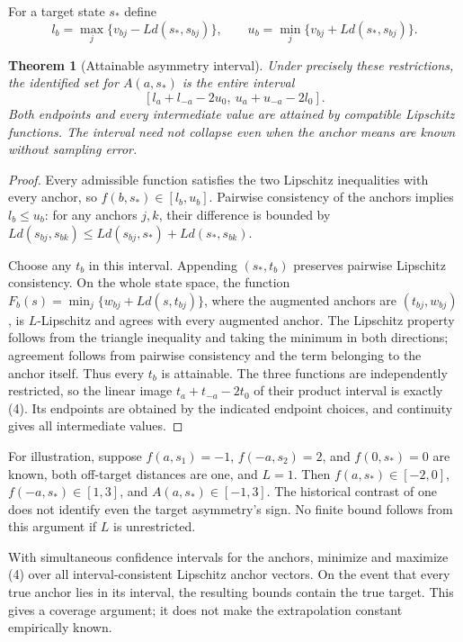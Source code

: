 \documentclass[11pt]{article}
\newtheorem{theorem}{Theorem}
\theoremstyle{definition}
\begin{document}
For a target state $s_*$ define
\[
 l_b=\max_j\{v_{bj}-L d(s_*,s_{bj})\},\qquad
 u_b=\min_j\{v_{bj}+L d(s_*,s_{bj})\}.
\]
\begin{theorem}[Attainable asymmetry interval]
Under precisely these restrictions, the identified set for $A(a,s_*)$ is the entire interval
\[
 [l_a+l_{-a}-2u_0,\ u_a+u_{-a}-2l_0].
 \tag{4}
\]
Both endpoints and every intermediate value are attained by compatible Lipschitz functions. The interval need not collapse even when the anchor means are known without sampling error.
\end{theorem}
\begin{proof}
Every admissible function satisfies the two Lipschitz inequalities with every anchor, so $f(b,s_*)\in[l_b,u_b]$. Pairwise consistency of the anchors implies $l_b\le u_b$: for any anchors $j,k$, their difference is bounded by $L d(s_{bj},s_{bk})\le Ld(s_{bj},s_*)+Ld(s_*,s_{bk})$.

Choose any $t_b$ in this interval. Appending $(s_*,t_b)$ preserves pairwise Lipschitz consistency. On the whole state space, the function
$F_b(s)=\min_j\{w_{bj}+L d(s,t_{bj})\}$, where the augmented anchors are $(t_{bj},w_{bj})$, is $L$-Lipschitz and agrees with every augmented anchor. The Lipschitz property follows from the triangle inequality and taking the minimum in both directions; agreement follows from pairwise consistency and the term belonging to the anchor itself. Thus every $t_b$ is attainable. The three functions are independently restricted, so the linear image $t_a+t_{-a}-2t_0$ of their product interval is exactly (4). Its endpoints are obtained by the indicated endpoint choices, and continuity gives all intermediate values.
\end{proof}
For illustration, suppose $f(a,s_1)=-1$, $f(-a,s_2)=2$, and $f(0,s_*)=0$ are known, both off-target distances are one, and $L=1$. Then $f(a,s_*)\in[-2,0]$, $f(-a,s_*)\in[1,3]$, and $A(a,s_*)\in[-1,3]$. The historical contrast of one does not identify even the target asymmetry's sign. No finite bound follows from this argument if $L$ is unrestricted.

With simultaneous confidence intervals for the anchors, minimize and maximize (4) over all interval-consistent Lipschitz anchor vectors. On the event that every true anchor lies in its interval, the resulting bounds contain the true target. This gives a coverage argument; it does not make the extrapolation constant empirically known.
\end{document}
